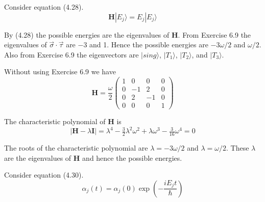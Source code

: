 


\bigskip
Consider equation (4.28).
\begin{equation*}
\mathbf H|E_j\rangle=E_j|E_j\rangle
\tag{4.28}
\end{equation*}

By (4.28) the possible energies are the eigenvalues of $\mathbf H$.
From Exercise 6.9 the eigenvalues of $\vec\sigma\cdot\vec\tau$ are $-3$ and 1.
Hence the possible energies are $-3\omega/2$ and $\omega/2$.
Also from Exercise 6.9 the eigenvectors are
$|sing\rangle$, $|T_1\rangle$, $|T_2\rangle$, and $|T_3\rangle$.

\bigskip
Without using Exercise 6.9 we have
\begin{equation*}
\mathbf H=\frac{\omega}{2}
\begin{pmatrix}
1&0&0&0
\\
0&-1&2&0
\\
0&2&-1&0
\\
0&0&0&1
\end{pmatrix}
\end{equation*}

The characteristic polynomial of $\mathbf H$ is
\begin{equation*}
|\mathbf H-\lambda\mathbf I|
=\lambda^4-\tfrac{3}{2}\lambda^2\omega^2+\lambda\omega^3-\tfrac{3}{16}\omega^4=0
\end{equation*}

The roots of the characteristic polynomial are $\lambda=-3\omega/2$ and $\lambda=\omega/2$.
These $\lambda$ are the eigenvalues of $\mathbf H$ and hence the possible energies.

\bigskip
Consider equation (4.30).
\begin{equation*}
\alpha_j(t)=\alpha_j(0)\exp\left(-\frac{iE_jt}{\hbar}\right)
\tag{4.30}
\end{equation*}

